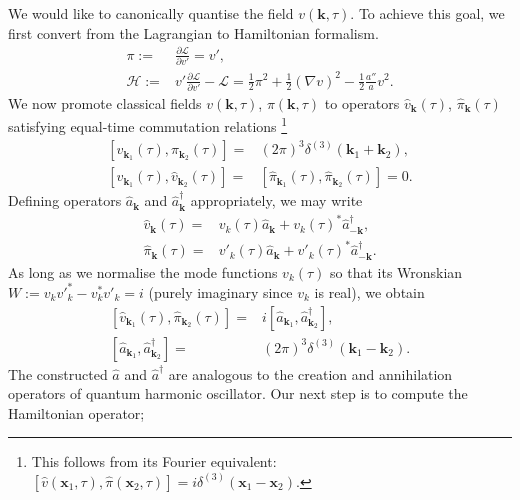 \documentclass[a4paper,12pt,times,custombib,print,index]{Classes/PhDThesisPSnPDF} %
\newcommand{\Lagr}{\mathcal{L}}		\newcommand{\Hami}{\mathcal{H}}		\newcommand{\vv}{\mathbf}			\newcommand{\pluseq}{\mathrel{+}=}	%
\providecommand{\DIFadd}[1]{{\protect\color{blue}\uwave{#1}}} %
\providecommand{\DIFaddbegin}{} %
\providecommand{\DIFaddend}{} %
\newcommand{\DIFaddincludegraphics}[2][]{{\color{blue}\fbox{\DIFOincludegraphics[#1]{#2}}}} %
\DeclareRobustCommand{\DIFaddbegin}{\DIFOaddbegin \let\includegraphics\DIFaddincludegraphics} %
\DeclareRobustCommand{\DIFaddend}{\DIFOaddend \let\includegraphics\DIFOincludegraphics} %
\begin{document}
We would like to canonically quantise the field $v(\vv{k},\tau)$. To achieve this goal, we first convert from the Lagrangian to Hamiltonian formalism.
\begin{align}
	\pi :=& \frac{\partial \Lagr}{\partial v'} = v', \\
	\Hami :=& v'\frac{\partial \Lagr}{\partial v'} - \Lagr = \frac{1}{2} \pi^2 + \frac{1}{2} (\nabla v)^2 - \frac{1}{2} \frac{a''}{a} v^2 .
\end{align}
We now promote classical fields $v(\vv{k},\tau)$, $\pi(\vv{k},\tau)$ to operators $\hat{v}_\vv{k}(\tau)$, $\hat{\pi}_\vv{k}(\tau)$ satisfying equal-time commutation relations \footnote{This follows from its Fourier equivalent: $[\hat{v}(\vv{x}_1,\tau),\hat{\pi}(\vv{x}_2,\tau)] = i\delta^{(3)}(\vv{x}_1 - \vv{x}_2)$.}
\begin{align}
	\left[ \hat{v}_{\vv{k}_1}(\tau), \hat{\pi}_{\vv{k}_2}(\tau) \right] =& (2\pi)^3 \delta^{(3)}(\vv{k}_1 + \vv{k}_2), \\
	\left[ \hat{v}_{\vv{k}_1}(\tau), \hat{v}_{\vv{k}_2}(\tau) \right] =& \left[ \hat{\pi}_{\vv{k}_1}(\tau), \hat{\pi}_{\vv{k}_2}(\tau) \right] = 0.
\end{align}
Defining operators $\hat{a}_\vv{k}$ and $\hat{a}_\vv{k}^\dagger$ appropriately, we may write
\begin{align}
	\hat{v}_\vv{k} (\tau) =& v_k(\tau) \hat{a}_\vv{k} + v_k(\tau)^* \hat{a}_{-\vv{k}}^\dagger,  \\
	\hat{\pi}_\vv{k} (\tau) =& {v'_k}(\tau) \hat{a}_\vv{k} + {v'_k}(\tau)^* \hat{a}_{-\vv{k}}^\dagger.
\end{align}
As long as we normalise the mode functions $v_k(\tau)$ so that its Wronskian $W := v_k v'^*_k - v_k^* v'_k = i$ (purely imaginary since $v_k$ is real), we obtain
\begin{align}
	\left[ \hat{v}_{\vv{k}_1}(\tau), \hat{\pi}_{\vv{k}_2}(\tau) \right] =& i \left[ \hat{a}_{\vv{k}_1}, \hat{a}^\dagger_{\vv{k}_2} \right], \\
	\left[ \hat{a}_{\vv{k}_1}, \hat{a}^\dagger_{\vv{k}_2} \right] =& (2\pi)^3 \delta^{(3)}(\vv{k}_1 - \vv{k}_2).	\label{eqn:canonical_quantisation_commutation_relation_a}
\end{align}
The constructed $\hat{a}$ and $\hat{a}^\dagger$ are analogous to the creation and annihilation operators of \DIFaddbegin \DIFadd{a }\DIFaddend quantum harmonic oscillator. Our next step is to compute the Hamiltonian operator;
\end{document}

